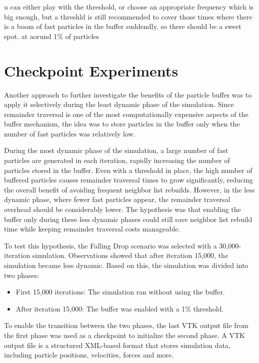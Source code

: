u can either play with the threshold, or choose an appropriate frequency which is big enough, but a threshld is still recommended to cover those times where there is a boom of fast particles in the buffer suddendly. so there should be a sweet spot. at aorund 1\% of particles

\section{Checkpoint Experiments}


Another approach to further investigate the benefits of the particle buffer was to apply it selectively during the least dynamic phase of the simulation. Since remainder traversal is one of the most computationally expensive aspects of the buffer mechanism, the idea was to store particles in the buffer only when the number of fast particles was relatively low.

During the most dynamic phase of the simulation, a large number of fast particles are generated in each iteration, rapidly increasing the number of particles stored in the buffer. Even with a threshold in place, the high number of buffered particles causes remainder traversal times to grow significantly, reducing the overall benefit of avoiding frequent neighbor list rebuilds. However, in the less dynamic phase, where fewer fast particles appear, the remainder traversal overhead should be considerably lower. The hypothesis was that enabling the buffer only during these less dynamic phases could still save neighbor list rebuild time while keeping remainder traversal costs manageable.


To test this hypothesis, the Falling Drop scenario was selected with a 30,000-iteration simulation. Observations showed that after iteration 15,000, the simulation became less dynamic. Based on this, the simulation was divided into two phases:

\begin{itemize}
    \item First 15,000 iterations: The simulation ran without using the buffer.
    \item After iteration 15,000: The buffer was enabled with a 1\% threshold.
\end{itemize}

To enable the transition between the two phases, the last VTK output file from the first phase was used as a checkpoint to initialize the second phase. A VTK output file is a structured XML-based format that stores simulation data, including particle positions, velocities, forces and more.

